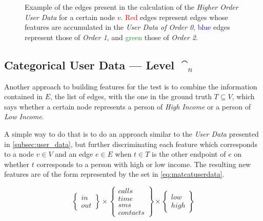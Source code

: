 
\begin{figure}
\centering
\framebox[\columnwidth]{%
	
}
\caption{Example of the edges present in the calculation of the \emph{Higher Order User Data} for a certain node $v$. \textcolor{red}{Red} edges represent edges whose features are accumulated in the \emph{User Data of Order 0}, \textcolor{blue}{blue} edges represent those of \emph{Order 1}, and \textcolor{ForestGreen}{green} those of \emph{Order 2}.}
\label{fig:higherorderuserdata}
\end{figure}

\subsection{Categorical User Data --- Level $\cat_n$}
\label{subsec:categoricaluserdata}

Another approach to building features for the test is to combine the information contained in $E$, the list of edges, with the one in the ground truth $T \subseteq V$, which says whether a certain node represents a person of \emph{High Income} or a person of \emph{Low Income}.

A simple way to do that is to do an approach similar to the \emph{User Data} presented in \cref{subsec:user_data}, but further discriminating each feature which corresponds to a node $v \in V$ and an edge $e \in E$ when $t \in T$ is the other endpoint of $e$ on whether $t$ corresponds to a person with high or low income. The resulting new features are of the form represented by the set in \cref{eq:matcatuserdata}.

\begin{equation}
\begin{Bmatrix} in \\ out \end{Bmatrix}
\times
\begin{Bmatrix} calls \\ time \\ sms \\ contacts \end{Bmatrix}
\times
\begin{Bmatrix} low \\ high \end{Bmatrix}
\label{eq:matcatuserdata}
\end{equation}

